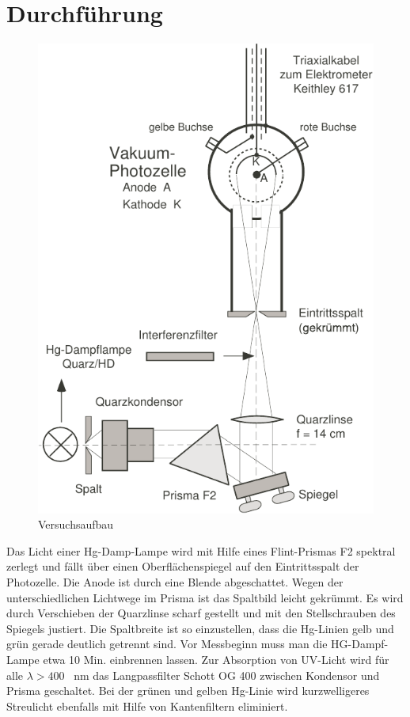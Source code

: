 \section{Durchf\"uhrung}

\begin{figure}
    \centering
    \includegraphics[width=\linewidth]{images/aufbau.pdf}
    \caption{Versuchsaufbau}
\end{figure}

Das Licht  einer  Hg-Damp-Lampe wird mit Hilfe eines Flint-Prismas F2 spektral
zerlegt und f\"allt \"uber einen Oberfl\"achenspiegel auf  den  Eintrittsspalt
der  Photozelle.  Die Anode ist durch  eine  Blende  abgeschattet.  Wegen  der
unterschiedlichen Lichtwege  im Prisma ist das Spaltbild leicht gekr\"ummt. Es
wird   durch  Verschieben  der  Quarzlinse  scharf  gestellt   und   mit   den
Stellschrauben des Spiegels justiert.  Die  Spaltbreite  ist  so einzustellen,
dass die  Hg-Linien  gelb  und  gr\"un  gerade  deutlich  getrennt  sind.  Vor
Messbeginn muss  man  die  HG-Dampf-Lampe  etwa 10 Min. einbrennen lassen. Zur
Absorption von  UV-Licht  wird  f\"ur alle $\lambda > 400$ \SI{}{\nano\meter} das
Langpassfilter Schott OG 400 zwischen Kondensor und Prisma geschaltet. Bei der
gr\"unen  und  gelben Hg-Linie wird kurzwelligeres  Streulicht  ebenfalls  mit
Hilfe von Kantenfiltern eliminiert.

